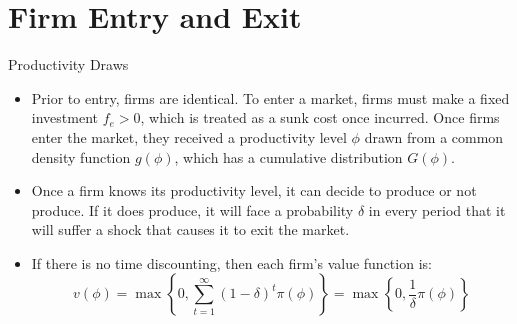\documentclass[aspectratio=169]{beamer}
\begin{document}

\section{Firm Entry and Exit}


\begin{frame}{Productivity Draws}

\begin{itemize}
    \item<1-> Prior to entry, firms are identical.  To enter a market, firms must make a fixed investment $ f_{e} > 0 $, which is treated as a sunk cost once incurred.  Once firms enter the market, they received a productivity level $ \phi $ drawn from a common density function $ g\left( \phi \right) $, which has a cumulative distribution $ G\left( \phi \right) $.
    \item<2-> Once a firm knows its productivity level, it can decide to produce or not produce.  If it does produce, it will face a probability $ \delta $ in every period that it will suffer a shock that causes it to exit the market.
    \item<3-> If there is no time discounting, then each firm’s value function is:
    \begin{equation*}
        v\left( \phi \right) = \max\left\{ 0, \sum_{t = 1}^{\infty }{\left( 1 - \delta \right)^{t}} \pi\left( \phi \right)\right\} = \max\left\{ 0, \frac{1}{\delta} \pi\left( \phi \right) \right\}
    \end{equation*}
\end{itemize}
    
\end{frame}

\end{document}

